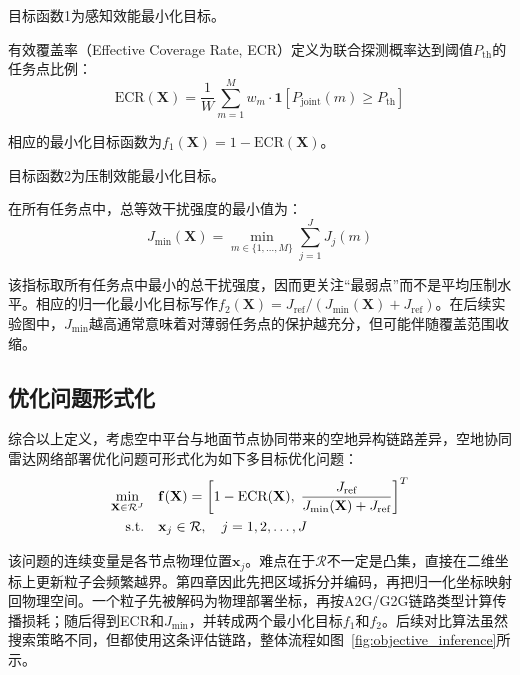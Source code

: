 目标函数1为感知效能最小化目标。

有效覆盖率（Effective Coverage Rate, ECR）定义为联合探测概率达到阈值$P_{\text{th}}$的任务点比例：
\vspace{0pt}
\begin{equation}
\text{ECR}(\mathbf{X}) = \frac{1}{W} \sum_{m=1}^{M} w_m \cdot \mathbf{1}[P_{\text{joint}}(m) \geq P_{\text{th}}]
\label{eq:ecr}
\end{equation}
\vspace{-1.0\baselineskip}

相应的最小化目标函数为$f_1(\mathbf{X}) = 1 - \text{ECR}(\mathbf{X})$。

目标函数2为压制效能最小化目标。

在所有任务点中，总等效干扰强度的最小值为：
\vspace{-0.5\baselineskip}
\begin{equation}
J_{\min}(\mathbf{X}) = \min_{m \in \{1,\ldots,M\}} \sum_{j=1}^{J} J_j(m)
\label{eq:jmin}
\end{equation}
\vspace{-1.0\baselineskip}

该指标取所有任务点中最小的总干扰强度，因而更关注“最弱点”而不是平均压制水平。相应的归一化最小化目标写作$f_2(\mathbf{X})=J_{\text{ref}}/(J_{\min}(\mathbf{X})+J_{\text{ref}})$。在后续实验图中，$J_{\min}$越高通常意味着对薄弱任务点的保护越充分，但可能伴随覆盖范围收缩。

\subsection{优化问题形式化}

综合以上定义，考虑空中平台与地面节点协同带来的空地异构链路差异，空地协同雷达网络部署优化问题可形式化为如下多目标优化问题：
\vspace{-0.5\baselineskip}
\begin{align}
\min_{\mathbf{X} \in \mathcal{R}^J} \quad & \mathbf{f}(\mathbf{X}) = \left[1 - \text{ECR}(\mathbf{X}), \; \frac{J_{\text{ref}}}{J_{\min}(\mathbf{X}) + J_{\text{ref}}}\right]^T \notag\\
\text{s.t.} \quad & \mathbf{x}_j \in \mathcal{R}, \quad j = 1, 2, \ldots, J
\label{eq:optimization_problem}
\end{align}
\vspace{-1.5\baselineskip}

该问题的连续变量是各节点物理位置$\mathbf{x}_j$。难点在于$\mathcal{R}$不一定是凸集，直接在二维坐标上更新粒子会频繁越界。第四章因此先把区域拆分并编码，再把归一化坐标映射回物理空间。一个粒子先被解码为物理部署坐标，再按A2G/G2G链路类型计算传播损耗；随后得到ECR和$J_{\min}$，并转成两个最小化目标$f_1$和$f_2$。后续对比算法虽然搜索策略不同，但都使用这条评估链路，整体流程如图~\ref{fig:objective_inference}所示。

